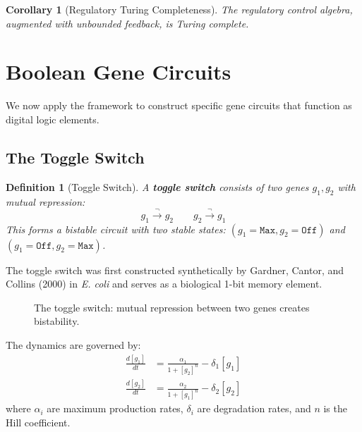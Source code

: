 \documentclass[12pt,a4paper]{article}
\newtheorem{corollary}[theorem]{Corollary}
\newtheorem{definition}[theorem]{Definition}
\begin{document}
\begin{corollary}[Regulatory Turing Completeness]\label{cor:turing}
The regulatory control algebra, augmented with unbounded feedback, is Turing complete.
\end{corollary}


\section{Boolean Gene Circuits}\label{sec:boolean-circuits}

We now apply the framework to construct specific gene circuits that function as digital logic elements.

\subsection{The Toggle Switch}

\begin{definition}[Toggle Switch]\label{def:toggle-switch}
A \textbf{toggle switch} consists of two genes $g_1, g_2$ with mutual repression:
\[
g_1 \xrightarrow{\neg} g_2 \qquad g_2 \xrightarrow{\neg} g_1
\]
This forms a bistable circuit with two stable states: $(g_1 = \texttt{Max}, g_2 = \texttt{Off})$ and $(g_1 = \texttt{Off}, g_2 = \texttt{Max})$.
\end{definition}

The toggle switch was first constructed synthetically by Gardner, Cantor, and Collins (2000) in \textit{E. coli} and serves as a biological 1-bit memory element.

\begin{figure}[H]
\centering
{}
\caption{The toggle switch: mutual repression between two genes creates bistability.}
\label{fig:toggle}
\end{figure}

The dynamics are governed by:
\begin{align}
\frac{d[g_1]}{dt} &= \frac{\alpha_1}{1 + [g_2]^n} - \delta_1 [g_1] \\
\frac{d[g_2]}{dt} &= \frac{\alpha_2}{1 + [g_1]^n} - \delta_2 [g_2]
\end{align}
where $\alpha_i$ are maximum production rates, $\delta_i$ are degradation rates, and $n$ is the Hill coefficient.
\end{document}
